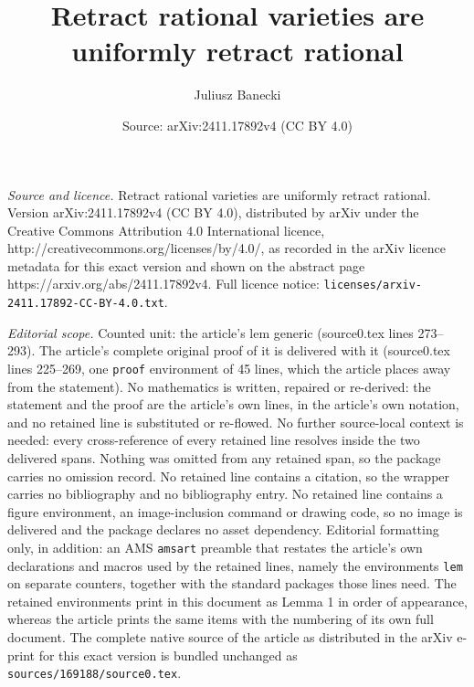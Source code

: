 \documentclass[10pt,a4paper]{amsart}
\title{Retract rational varieties are uniformly retract rational}
\author{Juliusz Banecki}
\date{Source: arXiv:2411.17892v4 (CC BY 4.0)}
\begin{document}
\maketitle

\noindent\emph{Source and licence.} Retract rational varieties are uniformly retract rational. Version arXiv:2411.17892v4 (CC BY 4.0), distributed by arXiv under the Creative Commons Attribution 4.0 International licence, http://creativecommons.org/licenses/by/4.0/, as recorded in the arXiv licence metadata for this exact version and shown on the abstract page https://arxiv.org/abs/2411.17892v4. Full licence notice: \texttt{licenses/arxiv-2411.17892-CC-BY-4.0.txt}.\par\smallskip

\noindent\textit{Editorial scope.} Counted unit: the article's lem generic (source0.tex lines 273--293). The article's complete original proof of it is delivered with it (source0.tex lines 225--269, one \texttt{proof} environment of 45 lines, which the article places away from the statement). No mathematics is written, repaired or re-derived: the statement and the proof are the article's own lines, in the article's own notation, and no retained line is substituted or re-flowed.  No further source-local context is needed: every cross-reference of every retained line resolves inside the two delivered spans.  Nothing was omitted from any retained span, so the package carries no omission record.  No retained line contains a citation, so the wrapper carries no bibliography and no bibliography entry.  No retained line contains a figure environment, an image-inclusion command or drawing code, so no image is delivered and the package declares no asset dependency.  Editorial formatting only, in addition: an AMS \texttt{amsart} preamble that restates the article's own declarations and macros used by the retained lines, namely the environments \texttt{lem} on separate counters, together with the standard packages those lines need.  The retained environments print in this document as Lemma 1 in order of appearance, whereas the article prints the same items with the numbering of its own full document.  The complete native source of the article as distributed in the arXiv e-print for this exact version is bundled unchanged as \texttt{sources/169188/source0.tex}.
\end{document}
